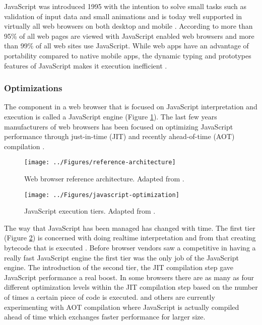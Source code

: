 JavaScript was introduced 1995 with the intention to solve small tasks such as validation of input data and small animations \parencite{Moller2018} and is today well supported in virtually all web browsers on both desktop and mobile \parencite{Zakai2011}. According to \textcite{TiwariSolihin2012} more than 95\% of all web pages are viewed with JavaScript enabled web browsers and more than 99\% of all web sites use JavaScript. While web apps have an advantage of portability compared to native mobile apps, the dynamic typing and prototypes features of JavaScript makes it execution inefficient \parencite{ParkJungMoon2015}.

\subsubsection{Optimizations}

The component in a web browser that is focused on JavaScript interpretation and execution is called a JavaScript engine (Figure \ref{reference-architecture}). The last few years manufacturers of web browsers has been focused on optimizing JavaScript performance through just-in-time (JIT) and recently ahead-of-time (AOT) compilation \parencite{HerreraChenLavoieHendren2018}.

\begin{figure}[!h]
\centering
\texttt{[image: ../Figures/reference-architecture]}
\caption{Web browser reference architecture. Adapted from \textcite{GrosskurthGodfrey2005}.}
\label{reference-architecture}
\end{figure}
    
\begin{figure}[!h]
\centering
\texttt{[image: ../Figures/javascript-optimization]}
\caption{JavaScript execution tiers. Adapted from \textcite{ParkKimMoon2017,ZhuykovVardanyanMelnikBuchatskiySharygin2015}.}
\label{javascript-optimization}
\end{figure}
    


The way that JavaScript has been managed has changed with time. The first tier (Figure \ref{javascript-optimization}) is concerned with doing realtime interpretation and from that creating bytecode that is executed \parencite{ParkKimMoon2017}. Before browser vendors saw a competitive in having a really fast JavaScript engine the first tier was the only job of the JavaScript engine. The introduction of the second tier, the JIT compilation step gave JavaScript performance a real boost. In some browsers there are as many as four different optimization levels within the JIT compilation step based on the number of times a certain piece of code is executed. \textcite{ZhuykovVardanyanMelnikBuchatskiySharygin2015} and others are currently experimenting with AOT compilation where JavaScript is actually compiled ahead of time which exchanges faster performance for larger size.

